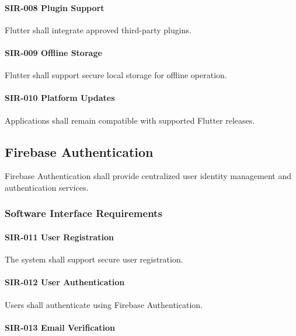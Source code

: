 \paragraph{SIR-008 Plugin Support}

Flutter shall integrate approved third-party plugins.

\paragraph{SIR-009 Offline Storage}

Flutter shall support secure local storage for offline operation.

\paragraph{SIR-010 Platform Updates}

Applications shall remain compatible with supported Flutter releases.


\subsection{Firebase Authentication}

Firebase Authentication shall provide centralized user identity
management and authentication services.


\subsubsection*{Software Interface Requirements}

\paragraph{SIR-011 User Registration}

The system shall support secure user registration.

\paragraph{SIR-012 User Authentication}

Users shall authenticate using Firebase Authentication.

\paragraph{SIR-013 Email Verification}

